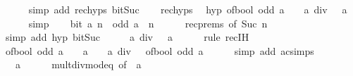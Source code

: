 \begin{isabellebody}
\ \ \ \ \isamarkupfalse%
\ {\isacharparenleft}{\kern0pt}simp\ add{\isacharcolon}{\kern0pt}\ rec{\isachardot}{\kern0pt}hyps\ bit{\isacharunderscore}{\kern0pt}Suc{\isacharparenright}{\kern0pt}\isanewline
\ \ \isamarkupfalse%
\ rec{\isachardot}{\kern0pt}hyps\ \isamarkupfalse%
\ hyp{\isacharcolon}{\kern0pt}\ {\isacartoucheopen}{\isacharparenleft}{\kern0pt}of{\isacharunderscore}{\kern0pt}bool\ {\isacharparenleft}{\kern0pt}odd\ a{\isacharparenright}{\kern0pt}\ {\isacharplus}{\kern0pt}\ {}\ {\isacharasterisk}{\kern0pt}\ a{\isacharparenright}{\kern0pt}\ div\ {}\ {\isacharequal}{\kern0pt}\ a{\isacartoucheclose}\isanewline
\ \ \ \ \isamarkupfalse%
\ simp\isanewline
\ \ \isamarkupfalse%
\ {\isacartoucheopen}bit\ a\ n\ {\isasymlongleftrightarrow}\ odd\ a{\isacartoucheclose}\ \ n\isanewline
\ \ \ \ \isamarkupfalse%
\ rec{\isachardot}{\kern0pt}prems\ {\isacharbrackleft}{\kern0pt}of\ {\isacartoucheopen}Suc\ n{\isacartoucheclose}{\isacharbrackright}{\kern0pt}\ \isamarkupfalse%
\ {\isacharparenleft}{\kern0pt}simp\ add{\isacharcolon}{\kern0pt}\ hyp\ bit{\isacharunderscore}{\kern0pt}Suc{\isacharparenright}{\kern0pt}\isanewline
\ \ \isamarkupfalse%
\ \isamarkupfalse%
\ {\isacartoucheopen}a\ div\ {}\ {\isacharequal}{\kern0pt}\ a{\isacartoucheclose}\isanewline
\ \ \ \ \isamarkupfalse%
\ {\isacharparenleft}{\kern0pt}rule\ rec{\isachardot}{\kern0pt}IH{\isacharparenright}{\kern0pt}\isanewline
\ \ \isamarkupfalse%
\ \isamarkupfalse%
\ {\isacartoucheopen}of{\isacharunderscore}{\kern0pt}bool\ {\isacharparenleft}{\kern0pt}odd\ a{\isacharparenright}{\kern0pt}\ {\isacharplus}{\kern0pt}\ {}\ {\isacharasterisk}{\kern0pt}\ a\ {\isacharequal}{\kern0pt}\ {}\ {\isacharasterisk}{\kern0pt}\ {\isacharparenleft}{\kern0pt}a\ div\ {}{\isacharparenright}{\kern0pt}\ {\isacharplus}{\kern0pt}\ of{\isacharunderscore}{\kern0pt}bool\ {\isacharparenleft}{\kern0pt}odd\ a{\isacharparenright}{\kern0pt}{\isacartoucheclose}\isanewline
\ \ \ \ \isamarkupfalse%
\ {\isacharparenleft}{\kern0pt}simp\ add{\isacharcolon}{\kern0pt}\ ac{\isacharunderscore}{\kern0pt}simps{\isacharparenright}{\kern0pt}\isanewline
\ \ \isamarkupfalse%
\ \isamarkupfalse%
\ {\isacartoucheopen}{\isasymdots}\ {\isacharequal}{\kern0pt}\ a{\isacartoucheclose}\isanewline
\ \ \ \ \isamarkupfalse%
\ mult{\isacharunderscore}{\kern0pt}div{\isacharunderscore}{\kern0pt}mod{\isacharunderscore}{\kern0pt}eq\ {\isacharbrackleft}{\kern0pt}of\ {}\ a{\isacharbrackright}{\kern0pt}\isanewline

\end{isabellebody}
